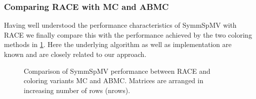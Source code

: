 \subsubsection{Comparing \acrshort{RACE} with \acrshort{MC} and \acrshort{ABMC}}
%
Having well understood the performance characteristics of  \acrshort{SymmSpMV} with \acrshort{RACE} we finally compare this with the performance achieved by the two coloring methods in \cref{fig:symm_spmv}. Here the underlying algorithm as well as implementation are known and are closely related to our approach. 
%
\begin{figure}[tbp]
	\centering
	\hspace{1em}
	\caption{Comparison of \acrshort{SymmSpMV} performance between \acrshort{RACE} and coloring variants \acrshort{MC} and \acrshort{ABMC}. Matrices are arranged in increasing number of rows (\acrshort{nrows}).}
	\label{fig:symm_spmv}
\end{figure}
